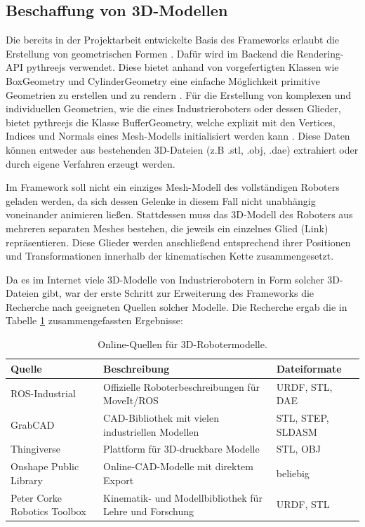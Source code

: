 \subsection{Beschaffung von 3D-Modellen}
Die bereits in der Projektarbeit entwickelte Basis des Frameworks erlaubt
die Erstellung von geometrischen Formen . 
Dafür wird im Backend die Rendering-API pythreejs verwendet.
Diese bietet anhand von vorgefertigten Klassen wie BoxGeometry und CylinderGeometry eine einfache
Möglichkeit primitive Geometrien zu erstellen und zu rendern .
Für die Erstellung von komplexen und individuellen Geometrien, wie die eines Industrieroboters oder dessen Glieder,
bietet pythreejs die Klasse BufferGeometry, welche explizit mit den Vertices, Indices und Normals
eines Mesh-Modells initialisiert werden kann . Diese Daten können entweder aus bestehenden 3D-Dateien
(z.B .stl, .obj, .dae) extrahiert oder durch eigene Verfahren erzeugt werden.

Im Framework soll nicht ein einziges Mesh-Modell des vollständigen Roboters geladen werden,
da sich dessen Gelenke in diesem Fall nicht unabhängig voneinander animieren ließen.
Stattdessen muss das 3D-Modell des Roboters aus mehreren separaten Meshes bestehen,
die jeweils ein einzelnes Glied (Link) repräsentieren.
Diese Glieder werden anschließend entsprechend ihrer Positionen und Transformationen innerhalb der kinematischen Kette zusammengesetzt.

Da es im Internet viele 3D-Modelle von Industrierobotern in Form solcher 3D-Dateien gibt,
war der erste Schritt zur Erweiterung des Frameworks die Recherche nach geeigneten Quellen solcher Modelle.
Die Recherche ergab die in Tabelle \ref{tab:robotermodelle} zusammengefassten Ergebnisse:

\vspace{1em}
\begin{table}[H]
\centering
\begin{tabular}{|p{4cm}|p{5.5cm}|p{4cm}|}
\hline
\textbf{Quelle} & \textbf{Beschreibung} & \textbf{Dateiformate} \\
\hline
ROS-Industrial & Offizielle Roboterbeschreibungen für MoveIt/ROS & URDF, STL, DAE \\
\hline
GrabCAD & CAD-Bibliothek mit vielen industriellen Modellen & STL, STEP, SLDASM \\
\hline
Thingiverse & Plattform für 3D-druckbare Modelle & STL, OBJ \\
\hline
Onshape Public Library & Online-CAD-Modelle mit direktem Export & beliebig \\
\hline
Peter Corke Robotics Toolbox & Kinematik- und Modellbibliothek für Lehre und Forschung & URDF, STL \\
\hline
\end{tabular}
\caption{Online-Quellen für 3D-Robotermodelle.}
\label{tab:robotermodelle}
\end{table}
\vspace{1em}

